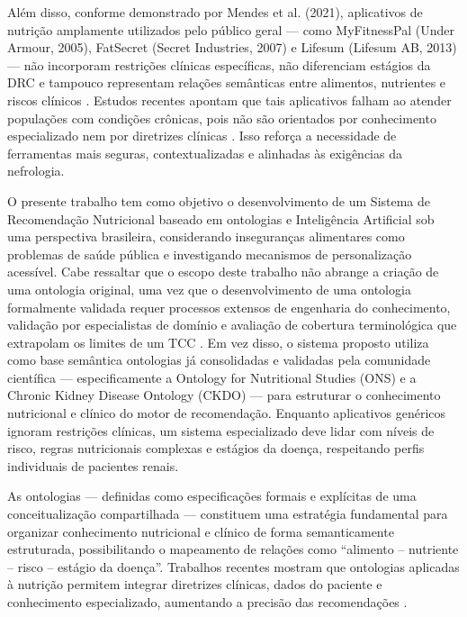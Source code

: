 \documentclass[12pt, a4paper, twocolumn]{article}
\begin{document}
Além disso, conforme demonstrado por Mendes et al. (2021), aplicativos de nutrição amplamente utilizados pelo público geral --- como MyFitnessPal (Under Armour, 2005), FatSecret (Secret Industries, 2007) e Lifesum (Lifesum AB, 2013) --- não incorporam restrições clínicas específicas, não diferenciam estágios da DRC e tampouco representam relações semânticas entre alimentos, nutrientes e riscos clínicos \cite{mendes2021}. Estudos recentes apontam que tais aplicativos falham ao atender populações com condições crônicas, pois não são orientados por conhecimento especializado nem por diretrizes clínicas \cite{mendes2021,chen2019}. Isso reforça a necessidade de ferramentas mais seguras, contextualizadas e alinhadas às exigências da nefrologia.

O presente trabalho tem como objetivo o desenvolvimento de um Sistema de Recomendação Nutricional baseado em ontologias e Inteligência Artificial sob uma perspectiva brasileira, considerando inseguranças alimentares como problemas de saúde pública e investigando mecanismos de personalização acessível. Cabe ressaltar que o escopo deste trabalho não abrange a criação de uma ontologia original, uma vez que o desenvolvimento de uma ontologia formalmente validada requer processos extensos de engenharia do conhecimento, validação por especialistas de domínio e avaliação de cobertura terminológica que extrapolam os limites de um TCC \cite{gruber1993}. Em vez disso, o sistema proposto utiliza como base semântica ontologias já consolidadas e validadas pela comunidade científica --- especificamente a Ontology for Nutritional Studies (ONS) e a Chronic Kidney Disease Ontology (CKDO) --- para estruturar o conhecimento nutricional e clínico do motor de recomendação. Enquanto aplicativos genéricos ignoram restrições clínicas, um sistema especializado deve lidar com níveis de risco, regras nutricionais complexas e estágios da doença, respeitando perfis individuais de pacientes renais.

As ontologias --- definidas como especificações formais e explícitas de uma conceitualização compartilhada \cite{gruber1993} --- constituem uma estratégia fundamental para organizar conhecimento nutricional e clínico de forma semanticamente estruturada, possibilitando o mapeamento de relações como ``alimento -- nutriente -- risco -- estágio da doença''. Trabalhos recentes mostram que ontologias aplicadas à nutrição permitem integrar diretrizes clínicas, dados do paciente e conhecimento especializado, aumentando a precisão das recomendações \cite{zhang2023,mendes2021,mckensy2022}.
\end{document}
